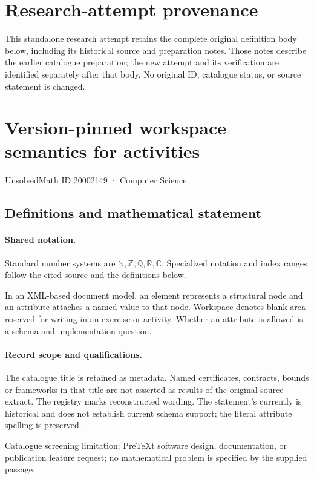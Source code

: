 \documentclass[11pt]{article}
\begin{document}
\section*{Research-attempt provenance}
This standalone research attempt retains the complete original definition body below,
including its historical source and preparation notes. Those notes describe the
earlier catalogue preparation; the new attempt and its verification are identified
separately after that body. No original ID, catalogue status, or source statement is changed.

\section{Version-pinned workspace semantics for activities}\label{20002149}
{\small UnsolvedMath ID 20002149 · Computer Science}
\subsection{Definitions and mathematical statement}

\paragraph{Shared notation.}Standard number systems are $\mathbb N,\mathbb Z,\mathbb Q,\mathbb R,\mathbb C$. Specialized notation and index ranges follow the cited source and the definitions below.


In an XML-based document model, an element represents a structural node and an attribute attaches a named value to that node. Workspace denotes blank area reserved for writing in an exercise or activity. Whether an attribute is allowed is a schema and implementation question.
\paragraph{Record scope and qualifications.}
The catalogue title is retained as metadata. Named certificates, contracts, bounds or frameworks in that title are not asserted as results of the original source extract.
The registry marks reconstructed wording. The statement's currently is historical and does not establish current schema support; the literal attribute spelling is preserved.

Catalogue screening limitation: PreTeXt software design, documentation, or publication feature request; no mathematical problem is specified by the supplied passage.
\end{document}

